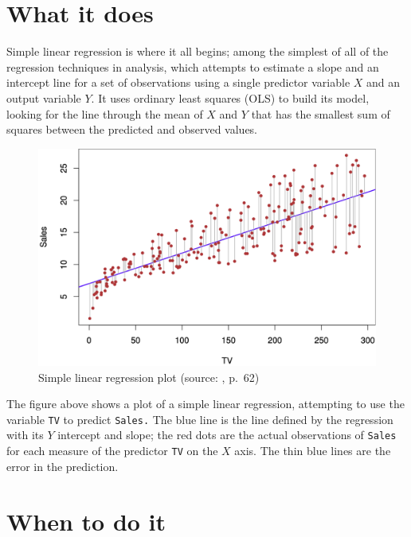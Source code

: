 \documentclass[
]{book}
\begin{document}
\hypertarget{what-it-does}{%
\section{What it does}\label{what-it-does}}

Simple linear regression is where it all begins; among the simplest of all of the regression techniques in analysis, which attempts to estimate a slope and an intercept line for a set of observations using a single predictor variable \(X\) and an output variable \(Y\). It uses ordinary least squares (OLS) to build its model, looking for the line through the mean of \(X\) and \(Y\) that has the smallest sum of squares between the predicted and observed values.



\begin{figure}
\includegraphics[width=16.03in]{images/3_1} \caption{Simple linear regression plot (source: \citet{ISLR}, p.~62)}\label{fig:img-slr1}
\end{figure}

The figure above shows a plot of a simple linear regression, attempting to use the variable \texttt{TV} to predict \texttt{Sales.} The blue line is the line defined by the regression with its \(Y\) intercept and slope; the red dots are the actual observations of \texttt{Sales} for each measure of the predictor \texttt{TV} on the \(X\) axis. The thin blue lines are the error in the prediction.

\hypertarget{when-to-do-it}{%
\section{When to do it}\label{when-to-do-it}}
\end{document}
